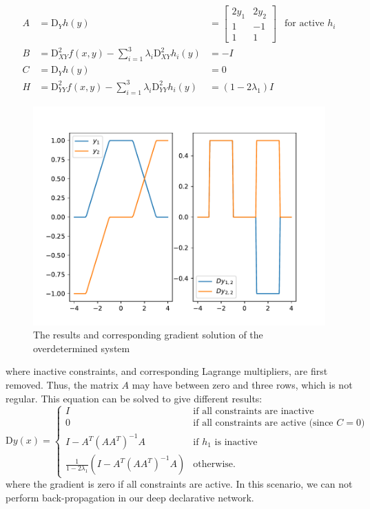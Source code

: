 $$
\begin{array}{llll}
    A &= \text{D}_{Y} h(y) &= \begin{bmatrix}
         2 y_1 & 2 y_2 \\ 1 & -1 \\ 1 & 1
         \end{bmatrix} & \text{for active $h_i$} \\
    B &= \text{D}^2_{XY} f(x, y) - \sum_{i=1}^{3} \lambda_i \text{D}^2_{XY} h_i(y) &= -I \\
    C &= \text{D}_{Y} h(y) &= 0 \\
    H &= \text{D}^2_{YY} f(x, y) - \sum_{i=1}^{3} \lambda_i \text{D}^2_{YY} h_i(y) &= (1 - 2 \lambda_1) I 
\end{array}
$$
\begin{figure}[t]
    \label{fig:overdetermined-gradient}
    \centering
    \includegraphics[page=1, width=.8\textwidth]{figs/overdetermined-gradient.pdf}
    \caption{The results and corresponding gradient solution of the overdetermined system}
\end{figure}
where inactive constraints, and corresponding Lagrange multipliers, are first removed. Thus, the matrix $A$ may have between zero and three rows, which is not regular. This equation can be solved to give different results: 
$$
\text{D} y(x) = \begin{cases}
        I & \text{if all constraints are inactive} \\
        0 & \text{if all constraints are active (since $C = 0$)} \\
        I - A^T (AA^T)^{-1} A & \text{if $h_1$ is inactive} \\
        \frac{1}{1 - 2 \lambda_1} \left(I - A^T (AA^T)^{-1} A\right) & \text{otherwise.}
    \end{cases}
$$
where the gradient is zero if all constraints are active. In this scenario, we can not perform back-propagation in our deep declarative network. 

